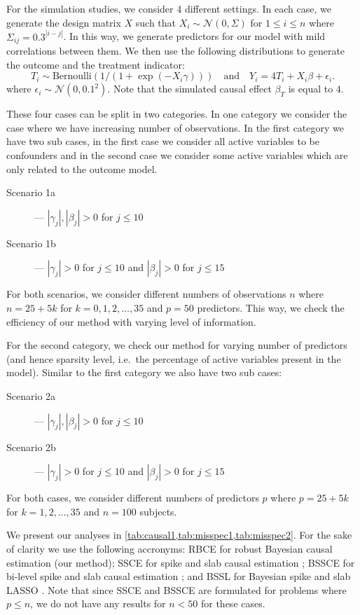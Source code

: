 \documentclass[preprint,12pt]{elsarticle}
\begin{document}
For the simulation studies, we consider 4 different settings. In each
case, we generate the design matrix $X$ such that $X_i\sim\mathcal{N}(0, \Sigma)$
for $1\le i\le n$ where $\Sigma_{ij} = 0.3^{|i-j|}$. In this way, we 
generate predictors for our model with mild correlations between them.
We then use the following distributions to generate the outcome and
the treatment indicator: 
\begin{equation}
    T_i \sim \text{Bernoulli}\left(1/(1+\exp(-X_i\gamma))\right)
    \quad\text{and}\quad
    Y_i = 4T_i + X_i\beta + \epsilon_i.
\end{equation}
where $\epsilon_i\sim\mathcal{N}(0,0.1^2)$.
Note that the simulated causal effect $\beta_T$ is equal to $4$.

These four cases can be split in two categories. In one category we consider the
case where we have increasing number of observations. In the first category we have two
sub cases, in the first case we consider all active variables to be confounders
and in the second case we consider some active variables which are only related to
the outcome model. 
\begin{description}
    \item[Scenario 1a] --- $|\gamma_j|, |\beta_j|>0$ for $j\le 10$
    \item[Scenario 1b] --- $|\gamma_j|>0$ for $j\le 10$ and $|\beta_j|>0$ for $j\le 15$
\end{description}
For both
scenarios, we consider different numbers of observations $n$ where
$n=25+ 5k$ for $k=0,1,2,\dots,35$ and $p=50$
predictors. This way, we check the efficiency of our method with varying level of information.

For the second category, we check our method for varying number of predictors 
(and hence sparsity level, i.e.\ the percentage of active variables present in the model).
Similar to the first category we also have two sub cases:
\begin{description}
    \item[Scenario 2a] --- $|\gamma_j|, |\beta_j|>0$ for $j\le 10$
    \item[Scenario 2b] --- $|\gamma_j|>0$ for $j\le 10$ and $|\beta_j|>0$ for $j\le 15$
\end{description}
For both
cases, we consider different numbers of predictors $p$ where
$p=25+ 5k$ for $k=1,2,\dots,35$ and $n=100$
subjects.

We present our analyses in \cref{tab:causal1,tab:misspec1,tab:misspec2}.
For the sake of clarity we use the following accronyms: RBCE for 
robust Bayesian causal estimation (our method); SSCE for spike and
slab causal estimation \citep{koch2020}; BSSCE for bi-level spike and slab causal
estimation \citep{koch2020}; and BSSL for Bayesian spike and slab LASSO
\citep{xu2015}. Note that since SSCE and BSSCE are formulated for problems
where $p\le n$, we do not have any results for $n<50$ for these cases.
\end{document}
